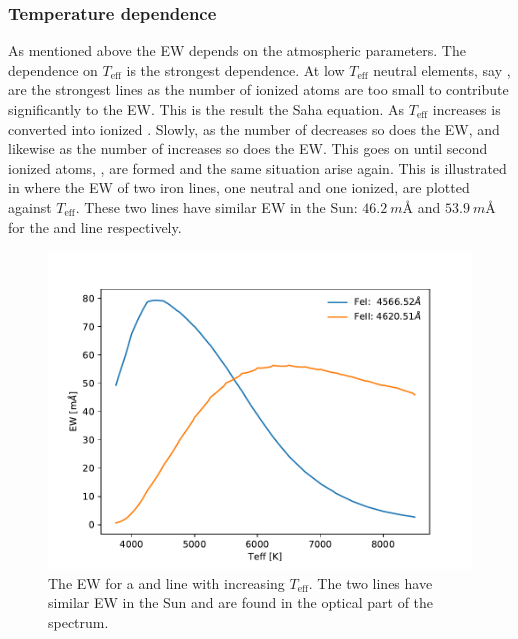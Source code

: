 \subsubsection{Temperature dependence}

As mentioned above the EW depends on the atmospheric parameters. The dependence
on $T_\mathrm{eff}$ is the strongest dependence. At low $T_\mathrm{eff}$ neutral
elements, say , are the strongest lines as the number of ionized
atoms are too small to contribute significantly to the EW. This is the result
the Saha equation. As $T_\mathrm{eff}$ increases  is converted into
ionized . Slowly, as the number of  decreases so does the
EW, and likewise as the number of  increases so does the EW. This
goes on until second ionized atoms, , are formed and the same
situation arise again. This is illustrated in  where the EW of
two iron lines, one neutral and one ionized, are plotted against
$T_\mathrm{eff}$. These two lines have similar EW in the Sun:
$\SI{46.2}{m}$\AA{} and $\SI{53.9}{m}$\AA{} for the  and 
line respectively.

\begin{figure}[htpb!]
    \centering
    \includegraphics[width=1.0\linewidth]{figures/ewTeff.pdf}
    \caption{The EW for a  and  line with increasing
             $T_\mathrm{eff}$. The two lines have similar EW in the Sun and are
             found in the optical part of the spectrum.}
    \label{fig:ewTeff}
\end{figure}


